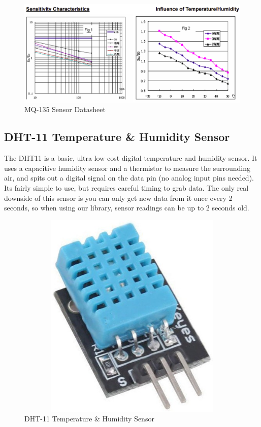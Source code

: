 
 
\begin{figure}[!ht]
\centering
\includegraphics[width=\linewidth]{figures/mq135-datasheet.png}
\caption{\label{img312} MQ-135 Sensor Datasheet}
\end{figure}


\subsection{DHT-11 Temperature \& Humidity Sensor}

The DHT11 is a basic, ultra low-cost digital temperature and humidity sensor. It uses a capacitive humidity sensor and a thermistor to measure the surrounding air, and spits out a digital signal on the data pin (no analog input pins needed). Its fairly simple to use, but requires careful timing to grab data. The only real downside of this sensor is you can only get new data from it once every 2 seconds, so when using our library, sensor readings can be up to 2 seconds old.

\begin{figure}[!ht]
\centering
\includegraphics[width=12cm,height=10cm]{figures/dth11}
\caption{\label{img313} DHT-11 Temperature \& Humidity Sensor}
\end{figure}

